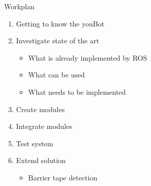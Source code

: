 \begin{frame}{Workplan}

%  

    \begin{enumerate}
        \item Getting to know the youBot
        \item Investigate state of the art
        \begin{itemize}
            \item What is already implemented by ROS
            \item What can be used
            \item What needs to be implemented
        \end{itemize}
        \item Create modules
        \item Integrate modules
        \item Test system
        \item Extend solution
        \begin{itemize}
            \item Barrier tape detection
        \end{itemize}
    \end{enumerate}

\end{frame}